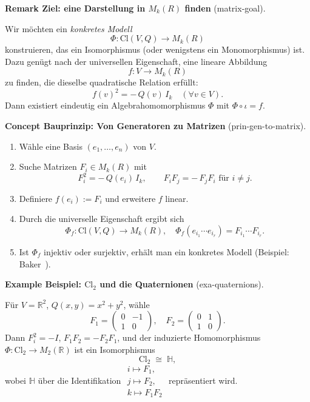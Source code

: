 \documentclass[10pt, letterpaper]{article}
\newcommand{\R}{\mathbb{R}}
\newcommand{\Cl}{\mathrm{Cl}}
\newcommand{\CustomHeading}[3]{%
  \par\medskip\noindent%
  \textbf{#1 #2} \textnormal{(#3)}.\enskip%
}
\newenvironment{REM}[2]{\begin{unitbox}\CustomHeading{Remark}{#1}{#2}}{\end{unitbox}}
\newenvironment{EXA}[2]{\begin{unitbox}\CustomHeading{Example}{#1}{#2}}{\end{unitbox}}
\newenvironment{CONC}[2]{\begin{unitbox}\CustomHeading{Concept}{#1}{#2}}{\end{unitbox}}
\begin{document}
\begin{REM}{Ziel: eine Darstellung in $M_k(R)$ finden}{matrix-goal}
Wir möchten ein \emph{konkretes Modell}
\[
\Phi:\Cl(V,Q)\longrightarrow M_k(R)
\]
konstruieren, das ein Isomorphismus (oder wenigstens ein Monomorphismus) ist.
Dazu genügt nach der universellen Eigenschaft, eine lineare Abbildung
\[
f:V\longrightarrow M_k(R)
\]
zu finden, die dieselbe quadratische Relation erfüllt:
\[
f(v)^2 = -\,Q(v)\,I_k \quad (\forall v\in V).
\]
Dann existiert eindeutig ein Algebrahomomorphismus $\Phi$ mit $\Phi\circ\iota=f$.
\end{REM}

\begin{CONC}{Bauprinzip: Von Generatoren zu Matrizen}{prin-gen-to-matrix}
\begin{enumerate}[label=(\alph*), leftmargin=*]
\item Wähle eine Basis $(e_1,\dots,e_n)$ von $V$.
\item Suche Matrizen $F_i\in M_k(R)$ mit
  \[
  F_i^2 = -\,Q(e_i)\,I_k,\qquad F_iF_j = -\,F_jF_i \text{ für } i\neq j.
  \]
\item Definiere $f(e_i):=F_i$ und erweitere $f$ linear.
\item Durch die universelle Eigenschaft ergibt sich
  \[
  \Phi_f:\Cl(V,Q)\longrightarrow M_k(R),\quad
  \Phi_f(e_{i_1}\cdots e_{i_r})=F_{i_1}\cdots F_{i_r}.
  \]
\item Ist $\Phi_f$ injektiv oder surjektiv, erhält man ein konkretes Modell
  (Beispiel: Baker~\cite[Thm.~5.4]{Baker2002}).
\end{enumerate}
\end{CONC}

\begin{EXA}{Beispiel: $\Cl_2$ und die Quaternionen}{exa-quaternions}
Für $V=\R^2$, $Q(x,y)=x^2+y^2$, wähle
\[
F_1=\begin{pmatrix}0&-1\\1&0\end{pmatrix},\quad
F_2=\begin{pmatrix}0&1\\1&0\end{pmatrix}.
\]
Dann $F_i^2=-I$, $F_1F_2=-F_2F_1$, und der induzierte
Homomorphismus $\Phi:\Cl_2\to M_2(\R)$ ist ein Isomorphismus
\[
\Cl_2\;\cong\;\mathbb{H},
\]
wobei $\mathbb{H}$ über die Identifikation
$\begin{smallmatrix}i\mapsto F_1,\\ j\mapsto F_2,\\ k\mapsto F_1F_2\end{smallmatrix}$ repräsentiert wird.
\end{EXA}
\end{document}
